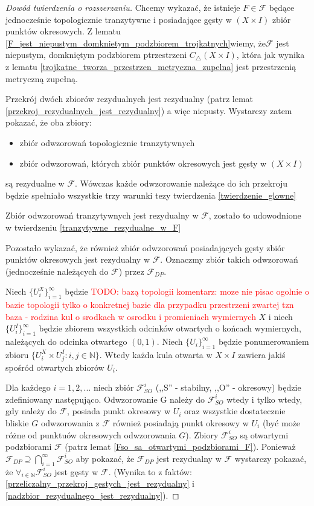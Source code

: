 \documentclass[licencjacka]{pwr_wmat_praca_dyplomowa}
\theoremstyle{plain}
\numberwithin{theorem}{chapter}
\theoremstyle{definition}
\numberwithin{theorem}{chapter}
\begin{document}
\begin{proof}[Dowód twierdzenia o rozszerzaniu]
Chcemy wykazać, że istnieje $F \in \mathcal{F}$ będące jednocześnie topologicznie tranzytywne i posiadające gęsty w $(X \times I)$ zbiór punktów okresowych. Z lematu \ref{F_jest_niepustym_domknietym_podzbiorem_trojkatnych}wiemy, że$\mathcal{F}$ jest niepustym, domkniętym podzbiorem ptrzestrzeni $C_{\triangle}(X \times I)$, która jak wynika z lematu \ref{trojkatne_tworza_przestrzen_metryczna_zupelna} jest przestrzenią metryczną zupełną. 

Przekrój dwóch zbiorów rezydualnych jest rezydualny (patrz lemat \ref{przekroj_rezydualnych_jest_rezydualny}) a więc niepusty. Wystarczy zatem pokazać, że oba zbiory:
\begin{itemize}
\item zbiór odwzorowań topologicznie tranzytywnych
\item zbiór odwzorowań, których zbiór punktów okresowych jest gęsty w $(X \times I)$
\end{itemize}
są rezydualne w $\mathcal{F}$. Wówczas każde odwzorowanie należące do ich przekroju będzie spełniało wszystkie trzy warunki tezy twierdzenia \ref{twierdzenie_glowne} 

Zbiór odwzorowań tranzytywnych jest rezydualny w $\mathcal{F}$, zostało to udowodnione w twierdzeniu \ref{tranzytywne_rezydualne_w_F}

Pozostało wykazać, że również zbiór odwzorowań posiadających gęsty zbiór punktów okresowych jest rezydualny w $\mathcal{F}$.
Oznaczmy zbiór takich odwzorowań (jednocześnie należących do $\mathcal{F}$) przez $\mathcal{F}_{DP}$.

Niech $\{U_i^X\}_{i=1}^{\infty}$ będzie \textcolor{red}{TODO: bazą topologii komentarz: moze nie pisac ogolnie o bazie topologii tylko o konkretnej bazie dla przypadku przestrzeni zwartej tzn baza - rodzina kul o srodkach w osrodku i promieniach wymiernych} $X$ i niech $\{U_i^I\}_{i=1}^{\infty}$ będzie zbiorem wszystkich odcinków otwartych o końcach wymiernych, należących do odcinka otwartego $(0, 1)$. Niech $\{U_i\}_{i=1}^{\infty}$ będzie ponumerowaniem zbioru $\{U_i^X \times U_j^I : i,j \in \mathbb{N}\}$. Wtedy każda kula otwarta w $X \times I$ zawiera jakiś spośród otwartych zbiorów $U_i$.

Dla każdego $i=1,2,...$ niech zbiór $\mathcal{F}_{SO}^i$ (,,S'' - stabilny, ,,O'' - okresowy) będzie zdefiniowany następująco. Odwzorowanie G należy do $\mathcal{F}_{SO}^i$ wtedy i tylko wtedy, gdy należy do $\mathcal{F}$, posiada punkt okresowy w $U_i$ oraz wszystkie dostatecznie bliskie $G$ odwzorowania z $\mathcal{F}$ również posiadają punkt okresowy w $U_i$ (być może różne od punktuów okresowych odwzorowania $G$). Zbiory $\mathcal{F}_{SO}^i$ są otwartymi podzbiorami $\mathcal{F}$ (patrz lemat \ref{Fso_sa_otwartymi_podzbiorami_F}). Ponieważ $\mathcal{F}_{DP} \supseteq \bigcap_{i=1}^{\infty} \mathcal{F}_{SO}^i$ aby pokazać, że $\mathcal{F}_{DP}$ jest rezydualny w $\mathcal{F}$ wystarczy pokazać, że $\forall_{i \in \mathbb{N}} \mathcal{F}_{SO}^i$ jest gęsty w $\mathcal{F}$. (Wynika to z faktów: \ref{przeliczalny_przekroj_gestych_jest_rezydualny}  i \ref{nadzbior_rezydualnego_jest_rezydualny}).


\end{proof}
\end{document}
